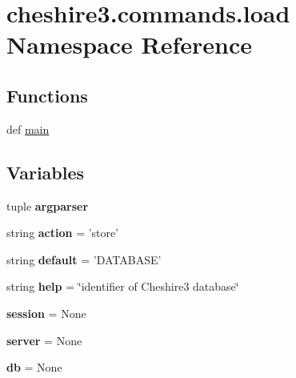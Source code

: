 \hypertarget{namespacecheshire3_1_1commands_1_1load}{\section{cheshire3.\-commands.\-load Namespace Reference}
\label{namespacecheshire3_1_1commands_1_1load}
}
\subsection*{Functions}
\begin{DoxyCompactItemize}
\item 
def \hyperlink{namespacecheshire3_1_1commands_1_1load_abd87cb66202a78992c73385f5048a5d6}{main}
\end{DoxyCompactItemize}
\subsection*{Variables}
\begin{DoxyCompactItemize}
\item 
tuple {\bfseries argparser}
\item 
\hypertarget{namespacecheshire3_1_1commands_1_1load_a9d15a9ca7bae7aa95de3a33a5ba33e5f}{string {\bfseries action} = 'store'}\label{namespacecheshire3_1_1commands_1_1load_a9d15a9ca7bae7aa95de3a33a5ba33e5f}

\item 
\hypertarget{namespacecheshire3_1_1commands_1_1load_ad45c753bf2f204f38e06e566603ea650}{string {\bfseries default} = 'D\-A\-T\-A\-B\-A\-S\-E'}\label{namespacecheshire3_1_1commands_1_1load_ad45c753bf2f204f38e06e566603ea650}

\item 
\hypertarget{namespacecheshire3_1_1commands_1_1load_a2d59b1f0d74544119a22e6af51ce9e58}{string {\bfseries help} = \char`\"{}identifier of Cheshire3 database\char`\"{}}\label{namespacecheshire3_1_1commands_1_1load_a2d59b1f0d74544119a22e6af51ce9e58}

\item 
\hypertarget{namespacecheshire3_1_1commands_1_1load_a4cfc20ffbf81d4c97da71c541c55491d}{{\bfseries session} = None}\label{namespacecheshire3_1_1commands_1_1load_a4cfc20ffbf81d4c97da71c541c55491d}

\item 
\hypertarget{namespacecheshire3_1_1commands_1_1load_ad7456315a257e3a39f0fa6f4e90cc44f}{{\bfseries server} = None}\label{namespacecheshire3_1_1commands_1_1load_ad7456315a257e3a39f0fa6f4e90cc44f}

\item 
\hypertarget{namespacecheshire3_1_1commands_1_1load_ad260949b46775d978a27aa4b2d3449fd}{{\bfseries db} = None}\label{namespacecheshire3_1_1commands_1_1load_ad260949b46775d978a27aa4b2d3449fd}

\end{DoxyCompactItemize}


